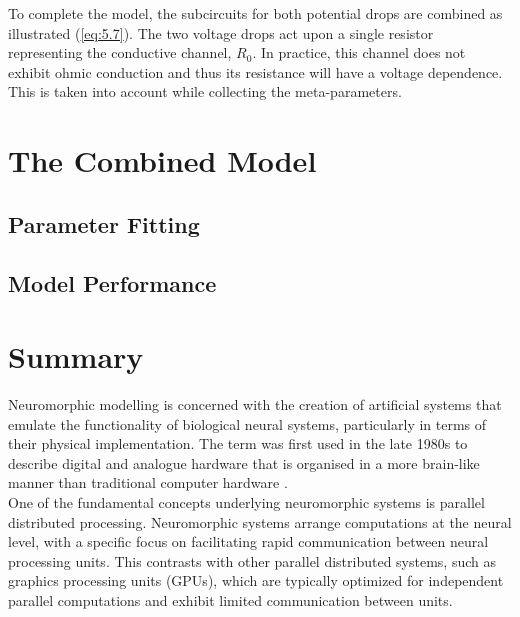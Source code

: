 \noindent To complete the model, the subcircuits for both potential drops are combined as illustrated (\ref{eq:5.7}). The two voltage drops act upon a single resistor representing the conductive channel, $R_0$. In practice, this channel does not exhibit ohmic conduction and thus its resistance will have a voltage dependence. This is taken into account while collecting the meta-parameters.

\section[The Combined Model]{The Combined Model}

\subsection[Parameter Fitting]{Parameter Fitting}

\subsection[Model Performance]{Model Performance}

\section[Summary]{Summary}

\noindent Neuromorphic modelling is concerned with the creation of artificial systems that emulate the functionality of biological neural systems, particularly in terms of their physical implementation. The term was first used in the late 1980s to describe digital and analogue hardware that is organised in a more brain-like manner than traditional computer hardware \cite{mead1990neuromorphic}. \\

\noindent One of the fundamental concepts underlying neuromorphic systems is parallel distributed processing. Neuromorphic systems arrange computations at the neural level, with a specific focus on facilitating rapid communication between neural processing units. This contrasts with other parallel distributed systems, such as graphics processing units (GPUs), which are typically optimized for independent parallel computations and exhibit limited communication between units. \\
